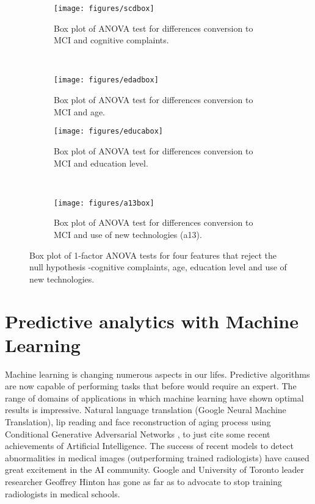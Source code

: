 \documentclass[11pt]{article}
\theoremstyle{definition}
\theoremstyle{remark}
\begin{document}
\begin{figure}[H]
    \centering
    \begin{subfigure}[t]{0.45\textwidth}
        \centering
        \texttt{[image: figures/scdbox]}
        \caption{Box plot of ANOVA test for differences conversion to MCI and cognitive complaints.}
    \end{subfigure}
    ~ 
    \begin{subfigure}[t]{0.45\textwidth}
        \centering
        \texttt{[image: figures/edadbox]}
        \caption{Box plot of ANOVA test for differences conversion to MCI and age.}
    \end{subfigure}%
    
     \begin{subfigure}[t]{0.45\textwidth}
        \centering
        \texttt{[image: figures/educabox]}
        \caption{Box plot of ANOVA test for differences conversion to MCI and education level.}
    \end{subfigure}
    ~ 
    \begin{subfigure}[t]{0.45\textwidth}
        \centering
        \texttt{[image: figures/a13box]}
        \caption{Box plot of ANOVA test for differences conversion to MCI and use of new technologies (a13).}
    \end{subfigure}%
    \caption{Box plot of 1-factor ANOVA tests for four features that reject the null hypothesis -cognitive complaints, age, education level and use of new technologies.} \label{fig:anovabox}
\end{figure}

\newpage
\section{Predictive analytics with Machine Learning} 
\label{se:mod}

Machine learning is changing numerous aspects in our lifes. Predictive algorithms are now capable of performing tasks that before would require an expert. The range of domains of applications in which machine learning have shown optimal results is impressive. Natural language translation (Google Neural Machine Translation), lip reading \cite{suwajanakorn2017synthesizing} and face  reconstruction of aging process using Conditional Generative Adversarial Networks \cite{antipov2017face}, to just cite some recent achievements of Artificial Intelligence.
The success of recent models to detect abnormalities in medical images (outperforming trained radiologists) have caused  great excitement in the AI community. Google and University of Toronto leader researcher Geoffrey Hinton has gone as far as to advocate to stop training radiologists in medical schools.
\end{document}
